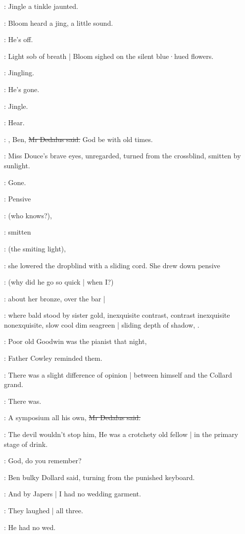 :
Jingle a tinkle jaunted.

:
Bloom heard a jing,
a little sound.

\BloomIntA:
He's off.

:
Light sob of breath |
Bloom sighed on the silent blue·hued flowers.

:
Jingling.

\BloomIntA:
He's gone.

:
Jingle.

\BloomIntA:
Hear.

\simon:
, Ben,
\sout{Mr Dedalus said.}
God be with old times.

:
Miss Douce's brave eyes,
unregarded,
turned from the crossblind,
smitten by sunlight.

\MissDInt:
Gone.

:
Pensive

\MissDInt:
(who knows?),

:
smitten

\MissDInt:
(the smiting light),

:
she lowered the dropblind with a sliding cord.
She drew down pensive

\MissDInt:
(why did he go so quick |
when I?)

:
about her bronze,
over the bar |

:
where bald stood by sister gold,
inexquisite contrast,
contrast inexquisite nonexquisite,
slow cool dim seagreen |
sliding depth of shadow,
.

\cowley:
Poor old Goodwin was the pianist that night,

:
Father Cowley reminded them.

\cowley:
There was a slight difference of opinion |
between himself and the Collard grand.

:
There was.

\simon:
A symposium all his own,
\sout{Mr Dedalus said.}

\simon:
The devil wouldn't stop him,
He was a crotchety old fellow |
in the primary stage of drink.

\dollard:
God,
do you remember?

:
Ben bulky Dollard said,
turning from the punished keyboard.

\dollard:
And by Japers |
I had no wedding garment.

:
They laughed |
all three.

\simon:
He had no wed.


